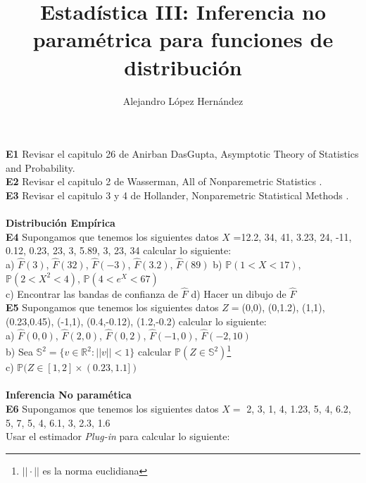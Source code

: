 \documentclass[11pt,spanish]{article}
\title{Estadística III: Inferencia no paramétrica para funciones de distribución}
\author{Alejandro López Hernández}
\begin{document}
\maketitle
\setlength\parindent{0pt}
\textbf{E1} Revisar el capitulo 26 de Anirban DasGupta, Asymptotic Theory of Statistics and Probability\cite{DaGuspa}.\\
\textbf{E2} Revisar el capitulo 2 de Wasserman, All of Nonparemetric Statistics \cite{Wasserman}.\\
\textbf{E3} Revisar el capitulo 3 y 4  de Hollander, Nonparemetric Statistical Methods \cite{Hollander}.\\\\
\textbf{Distribución Empírica}\\
\textbf{E4} Supongamos que tenemos los siguientes datos $X$ =12.2, 34, 41, 3.23, 24, -11, 0.12, 0.23, 23, 3, 5.89, 3, 23, 34 calcular lo siguiente: \\
\hspace*{6mm} a) $\hat{F}(3)$, $\hat{F}(32)$, $\hat{F}(-3)$, $\hat{F}(3.2)$, $\hat{F}(89)$
\hspace*{6mm} b) $\mathbb{P}(1<X<17)$, $\mathbb{P}(2<X^2<4)$, $\mathbb{P}(4<e^X<67)$\\
\hspace*{6mm} c) Encontrar las bandas de confianza de $\hat{F}$ 
\hspace*{6mm} d) Hacer un dibujo de $\hat{F}$ \\
\textbf{E5} Supongamos que tenemos los siguientes datos $Z = $(0,0), (0,1.2), (1,1), (0.23,0.45), (-1,1), (0.4,-0.12), (1.2,-0.2) calcular lo siguiente: \\
\hspace*{6mm} a) $\hat{F}(0,0)$, $\hat{F}(2,0)$, $\hat{F}(0,2)$, $\hat{F}(-1,0)$, $\hat{F}(-2,10)$\\
\hspace*{6mm} b) Sea $\mathbb{S}^2 = \{v\in\mathbb{R}^2:||v||<1\}$ calcular $\mathbb{P}(Z\in \mathbb{S}^2)$\footnote{$||\cdot||$ es la norma euclidiana}\\
\hspace*{6mm} c) $\mathbb{P}(Z\in [1,2]\times (0.23,1.1])$\\\\
\textbf{Inferencia No paramética}\\
\textbf{E6} Supongamos que tenemos los siguientes datos $X=$ 2, 3, 1, 4, 1.23, 5, 4, 6.2, 5, 7, 5, 4, 6.1, 3, 2.3, 1.6\\ Usar el estimador \emph{Plug-in} para calcular lo siguiente: \\
\end{document}
